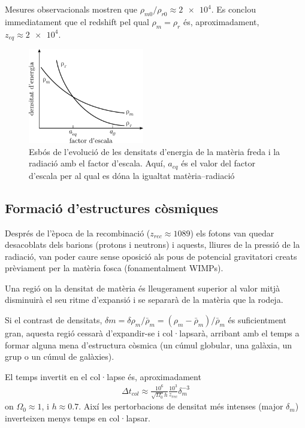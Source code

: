 Mesures observacionals mostren que $\rho_{m0}/\rho_{r0} \approx \num{2 e4}$. Es conclou immediatament que el redshift pel qual $\rho_{m} = \rho_{r}$ és, aproximadament, $z_{eq} \approx \num{2 e4}$.
\begin{figure}[H]
	\centering
	\includegraphics[width=0.45\textwidth]{./images/9-mat-rad-factor-escala}
	\caption{Esbós de l'evolució de les densitats d'energia de la matèria freda i la radiació amb el factor d'escala. Aquí, $a_{eq}$ és el valor del factor d'escala per al qual es dóna la igualtat matèria--radiació}
	\label{fig:mat-rad-factor-escala}
\end{figure}

\subsection{Formació d'estructures còsmiques}
Després de l'època de la recombinació ($z_{rec} \approx 1089$) els fotons van quedar desacoblats dels barions (protons i neutrons) i aquests, lliures de la pressió de la radiació, van poder caure sense oposició als pous de potencial gravitatori creats prèviament per la matèria fosca (fonamentalment WIMPs).

Una regió on la densitat de matèria és lleugerament superior al valor mitjà disminuirà el seu ritme d'expansió i se separarà de la matèria que la rodeja.

Si el contrast de densitats, $\delta{m} = \delta \rho_{m} / \bar{\rho}_{m} = (\rho_{m} - \bar{\rho}_{m}) / \bar{\rho}_{m}$ és suficientment gran, aquesta regió cessarà d'expandir-se i col·lapsarà, arribant amb el temps a formar alguna mena d'estructura còsmica (un cúmul globular, una galàxia, un grup o un cúmul de galàxies).

El temps invertit en el col·lapse és, aproximadament
\begin{align}
	\Delta t_{col} \approx \frac{10^{6}}{\sqrt{\Omega_{0}} h} \frac{10^{3}}{z_{rec}} \delta^{-3}_{m}
\end{align}
on $\Omega_{0} \approx 1$, i $h \approx 0.7$. Així les pertorbacions de densitat més intenses (major $\delta_{m}$) inverteixen menys temps en col·lapsar.

